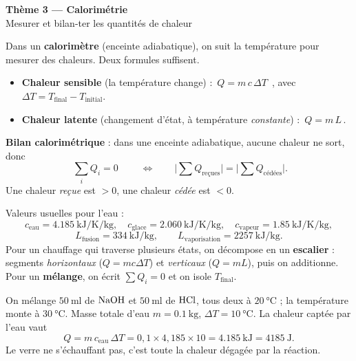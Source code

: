 \documentclass[11pt,a4paper]{article}
\begin{document}
\begin{center}
{\Large\bfseries\color{primarydark} Thème 3 — Calorimétrie}\\[2pt]
{\color{primary}\small Mesurer et bilan-ter les quantités de chaleur}
\end{center}

\begin{cle}
Dans un \textbf{calorimètre} (enceinte adiabatique), on suit la température pour mesurer des chaleurs. Deux formules suffisent.
\begin{itemize}[leftmargin=1.6em,topsep=2pt,itemsep=2pt]
  \item \textbf{Chaleur sensible} (la température change) : \; $\boxed{\,Q = m\,c\,\Delta T\,}$ \;, avec $\Delta T = T_{\text{final}} - T_{\text{initial}}$.
  \item \textbf{Chaleur latente} (changement d'état, à température \emph{constante}) : \; $\boxed{\,Q = m\,L\,}$.
\end{itemize}
\textbf{Bilan calorimétrique} : dans une enceinte adiabatique, aucune chaleur ne sort, donc
\[ \boxed{\;\textstyle\sum_i Q_i = 0\;} \qquad\Longleftrightarrow\qquad \big|\textstyle\sum Q_{\text{reçues}}\big| = \big|\textstyle\sum Q_{\text{cédées}}\big|. \]
Une chaleur \emph{reçue} est $>0$, une chaleur \emph{cédée} est $<0$.
\end{cle}

\begin{methode}
Valeurs usuelles pour l'eau :
\[ c_{\text{eau}}=\qty{4.185}{\kilo\joule\per\kelvin\per\kilogram},\quad
   c_{\text{glace}}=\qty{2.060}{\kilo\joule\per\kelvin\per\kilogram},\quad
   c_{\text{vapeur}}=\qty{1.85}{\kilo\joule\per\kelvin\per\kilogram}, \]
\[ L_{\text{fusion}}=\qty{334}{\kilo\joule\per\kilogram},\qquad L_{\text{vaporisation}}=\qty{2257}{\kilo\joule\per\kilogram}. \]
Pour un chauffage qui traverse plusieurs états, on décompose en un \textbf{escalier} : segments \emph{horizontaux} ($Q=mc\Delta T$) et \emph{verticaux} ($Q=mL$), puis on additionne. Pour un \textbf{mélange}, on écrit $\sum Q_i=0$ et on isole $T_{\text{final}}$.
\end{methode}

\begin{exemplebox}
On mélange $\qty{50}{\milli\litre}$ de $\ce{NaOH}$ et $\qty{50}{\milli\litre}$ de $\ce{HCl}$, tous deux à $\qty{20}{\celsius}$ ; la température monte à $\qty{30}{\celsius}$. Masse totale d'eau $m=\qty{0.1}{\kilogram}$, $\Delta T=\qty{10}{\celsius}$. La chaleur captée par l'eau vaut
\[ Q = m\,c_{\text{eau}}\,\Delta T = 0{,}1\times 4{,}185\times 10 = \qty{4.185}{\kilo\joule} = \qty{4185}{\joule}. \]
Le verre ne s'échauffant pas, c'est toute la chaleur dégagée par la réaction.
\end{exemplebox}
\end{document}
